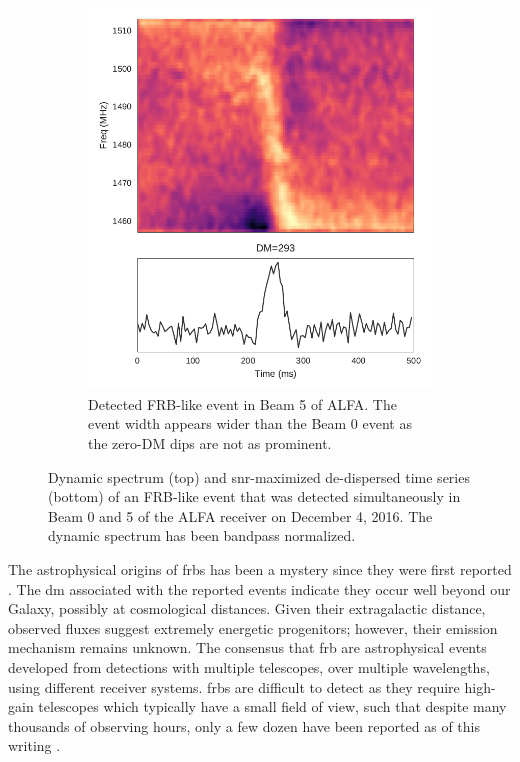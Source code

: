 \documentclass[a4paper,fleqn,usenatbib]{mnras}
\begin{document}
\begin{figure}
\begin{subfigure}[t]{0.45\textwidth}
        \includegraphics[width=1.0\textwidth]{figures/D20161204_buf4_Beam5.pdf}
        \caption{Detected FRB-like event in Beam 5 of ALFA. The event width
        appears wider than the Beam 0 event as the zero-DM dips are not as
        prominent.
        }
        \label{fig:beam5_dynamic_spec}
    \end{subfigure}
    \caption{
    Dynamic spectrum (top) and \gls{snr}-maximized de-dispersed time series
    (bottom) of an FRB-like event that was detected simultaneously in Beam 0 and
    5 of the ALFA receiver on December 4, 2016. The dynamic spectrum has been
    bandpass normalized.
    }
    \label{fig:dynamic_spec}
\end{figure}

The astrophysical origins of \glspl{frb} has been a mystery since they were
first reported \citep{2007Sci...318..777L}. The \gls{dm} associated with the
reported events indicate they occur well beyond our Galaxy, possibly at
cosmological distances.  Given their extragalactic distance, observed fluxes
suggest extremely energetic progenitors; however, their emission mechanism
remains unknown.  The consensus that \gls{frb} are astrophysical events
developed from  detections with multiple telescopes, over multiple wavelengths,
using different receiver systems. \glspl{frb} are difficult to detect as they
require high-gain telescopes which typically have a small field of view, such
that despite many thousands of observing hours, only a few dozen have been
reported as of this writing \citep{2016PASA...33...45P}.
\end{document}
